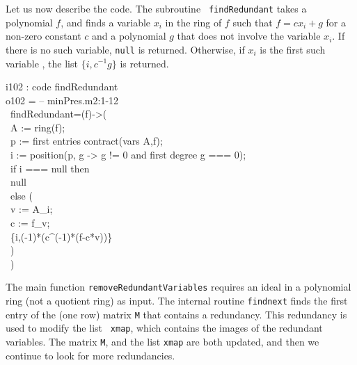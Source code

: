   Let us now describe the \Mtwo code.  The subroutine {\tt
    findRedundant} takes a polynomial $f$, and finds a variable $x_i$
  in the ring of $f$ such that $f = c x_i + g$ for a non-zero
  constant $c$ and a polynomial $g$ that does not involve the
  variable $x_i$.  If there is no such variable, {\tt null} is
  returned.  Otherwise, if $x_i$ is the first such variable , the list
  $\{i, c^{-1} g\}$ is returned.

\beginOutput
i102 : code findRedundant\\
\emptyLine
o102 = -- minPres.m2:1-12\\
\       findRedundant=(f)->(\\
\            A := ring(f);\\
\            p := first entries contract(vars A,f);\\
\            i := position(p, g -> g != 0 and first degree g === 0);\\
\            if i === null then\\
\                null\\
\            else (\\
\                 v := A_i;\\
\                 c := f_v;\\
\                 \{i,(-1)*(c^(-1)*(f-c*v))\}\\
\                 )\\
\            )\\
\endOutput

The main function {\tt removeRedundantVariables} requires an ideal in a
polynomial ring (not a quotient ring) as input.  The internal
routine {\tt findnext} finds the first entry of the (one row) matrix {\tt M}
that contains a redundancy.  This redundancy is used to modify the list {\tt
xmap}, which contains the images of the redundant variables.
The matrix {\tt M}, and the list {\tt xmap} are both updated, and 
then we continue to look for more redundancies.

